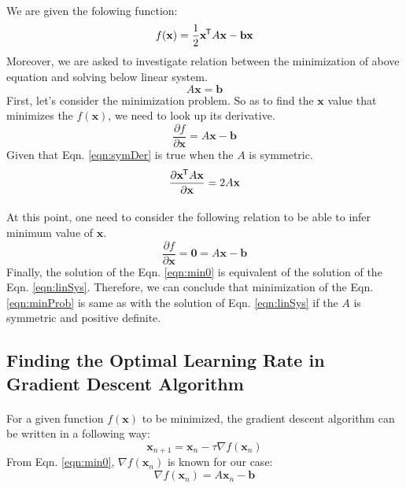 \documentclass[letterpaper,12pt]{article}
\newcommand*{\tran}{^{\mkern-1.5mu\mathsf{T}}}
\begin{document}
\paragraph{} We are given the folowing function:
\begin{equation}
   \label{eqn:minProb}
   f(\mathbf{x}) =\frac{1}{2} \mathbf{x} \tran A \mathbf{x} - \mathbf{b} \mathbf{x}
\end{equation}
Moreover, we are asked to investigate relation between the minimization of above equation and solving below linear system.
\begin{equation}
   \label{eqn:linSys}
   A\mathbf{x} = \mathbf{b}
\end{equation}
First, let's consider the minimization problem. So as to find the $\mathbf{x}$ value that minimizes the $f(\mathbf{x})$, we need to look up its derivative.
\begin{equation*}
   \frac{\partial f}{\partial \mathbf{x}} = A\mathbf{x} - \mathbf{b}
\end{equation*}
Given that Eqn. \ref{eqn:symDer} is true when the $A$ is symmetric.
\begin{equation}
   \label{eqn:symDer}
   \frac{\partial  \mathbf{x} \tran A \mathbf{x} }{\partial \mathbf{x}} = 2A\mathbf{x}
\end{equation}
\paragraph{}At this point, one need to consider the following relation to be able to infer minimum value of $\mathbf{x}$.
\begin{equation}
   \label{eqn:min0}
   \frac{\partial f}{\partial \mathbf{x}} = \mathbf{0} = A\mathbf{x} - \mathbf{b}
\end{equation}
Finally, the solution of the Eqn. \ref{eqn:min0} is equivalent of the solution of the Eqn. \ref{eqn:linSys}. Therefore, we can conclude that minimization of the Eqn. \ref{eqn:minProb} is same as with the solution of Eqn. \ref{eqn:linSys} if the $A$ is symmetric and positive definite.

\subsection{Finding the Optimal Learning Rate in Gradient Descent Algorithm}
\paragraph{}For a given function $f(\mathbf{x})$ to be minimized, the gradient descent algorithm can be written in a following way:
\begin{equation*}
   \mathbf{x}_{n+1} = \mathbf{x}_n - \tau \nabla f(\mathbf{x}_n)
\end{equation*}
From Eqn. \ref{eqn:min0}, $\nabla f(\mathbf{x}_n)$ is known for our case:
\begin{equation*}
   \nabla f(\mathbf{x}_n) = A\mathbf{x}_n - \mathbf{b}
\end{equation*}
\end{document}
